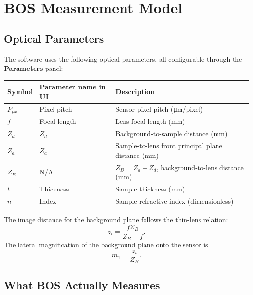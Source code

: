 \documentclass[11pt]{article}
\begin{document}
\section{BOS Measurement Model}
\label{sec:model}

\subsection{Optical Parameters}
\label{sec:params}

The software uses the following optical parameters, all configurable through
the \textbf{Parameters} panel:

\begin{center}
\begin{tabular}{lll}
  \toprule
  \rowcolor{accentlight} Symbol & Parameter name in UI & Description \\
  \midrule
  $P_{px}$ & Pixel pitch & Sensor pixel pitch (\si{\micro\metre/pixel}) \\
  $f$      & Focal length & Lens focal length (\si{mm}) \\
  $Z_d$    & $Z_d$ & Background-to-sample distance (\si{mm}) \\
  $Z_a$    & $Z_a$ & Sample-to-lens front principal plane distance (\si{mm}) \\
  $Z_B$    & N/A & $Z_B = Z_a + Z_d$, background-to-lens distance (\si{mm}) \\
  $t$      & Thickness & Sample thickness (\si{mm}) \\
  $n$      & Index & Sample refractive index (dimensionless) \\
  \bottomrule
\end{tabular}
\end{center}

The image distance for the background plane follows the thin-lens relation:
\begin{equation}
  z_i = \frac{f Z_B}{Z_B - f}.
  \label{eq:zi}
\end{equation}
The lateral magnification of the background plane onto the sensor is
\begin{equation}
  m_1 = \frac{z_i}{Z_B}.
  \label{eq:mag}
\end{equation}

\subsection{What BOS Actually Measures}
\label{sec:opl}
\end{document}
